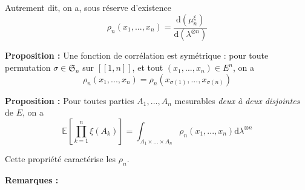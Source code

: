 \documentclass[12pt]{article}
\begin{document}
Autrement dit, on a, sous réserve d'existence $$ \rho_n(x_1,...,x_n) = \frac{\mathrm d (\mu^\xi_n)}{\mathrm d (\lambda^{\otimes n})} $$

\textbf{Proposition :} Une fonction de corrélation est symétrique : pour toute permutation $ \sigma \in \mathfrak{S}_n$ sur $[\![1,n]\!]$, et tout $(x_1,...,x_n) \in E^n$, on a $$ \rho_n(x_1,...,x_n) = \rho_n(x_{\sigma(1)},...,x_{\sigma(n)}) $$

\textbf{Proposition :} Pour toutes parties $A_1,...,A_n$ mesurables \textit{deux à deux disjointes} de $E$, on a $$ \boxed{ \mathbb E \left[ \prod_{k=1}^n \xi(A_k) \right] = \int_{A_1\times ... \times A_n} \rho_n(x_1,...,x_n) \mathrm d \lambda^{\otimes n} }$$

Cette propriété caractérise les $ \rho_n $. 

\textbf{Remarques :} 
\end{document}
